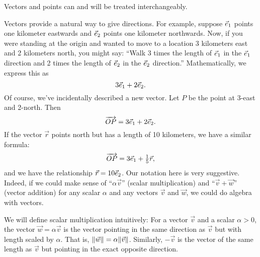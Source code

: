 \begin{emphbox}[Takeaway]
	Vectors and points can and will be treated interchangeably.
\end{emphbox}


Vectors provide a natural way to give directions.
For example, suppose ${\vec e_1}$ points one kilometer eastwards and ${\vec e_2}$
points one kilometer northwards.  Now, if you were standing at the origin
and wanted to move to a location 3 kilometers east and 2 kilometers north, you might say:
``Walk 3 times the length of ${\vec e_1}$  in the ${\vec e_1}$ direction and 2 times
the length of ${\vec e_2}$ in the ${\vec e_2}$ direction.''  Mathematically, we express this
as
\[
	3{\vec e_1}+2{\vec e_2}.
\]
Of course, we've incidentally described a new vector.  Let $P$
be the point at 3-east and 2-north.  Then
\[
	\overrightarrow{OP}=3{\vec e_1}+2{\vec e_2}.
\]
If the vector $\vec r$ points north but has a length of 10 kilometers, we have
a similar formula:
\[
	\overrightarrow{OP}=3{\vec e_1}+\tfrac{1}{5}\vec r,
\]
and we have the relationship $\vec r=10{\vec e_2}$.
Our notation here is very suggestive.  Indeed, if we could make
sense of ``$\alpha\vec v$'' (scalar multiplication) and ``$\vec v+\vec w$'' (vector addition)
for any scalar $\alpha$ and any vectors
$\vec v$ and $\vec w$, we could
do algebra with vectors.

We will define scalar multiplication intuitively:
For a vector $\vec v$ and a scalar $\alpha>0$, the
vector $\vec w=\alpha\vec v$ is the vector pointing in the same direction as
$\vec v$ but with length scaled by $\alpha$.  That is, $\lVert\vec w\rVert=\alpha\lVert\vec v\rVert$.
Similarly, $-\vec v$ is the vector of the same length as $\vec v$ but
pointing in the exact opposite direction.

\begin{center}
\end{center}

